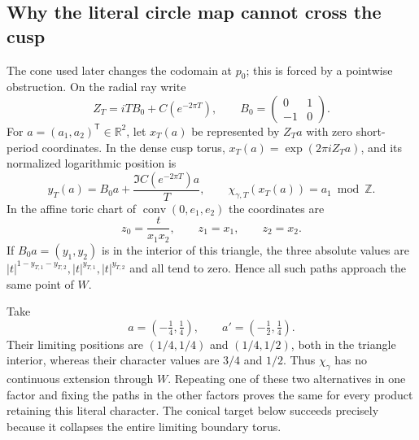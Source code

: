 \documentclass[11pt,letterpaper]{article}
\numberwithin{equation}{section}
\theoremstyle{definition}
\theoremstyle{remark}
\newcommand{\R}{\mathbb R}
\newcommand{\Z}{\mathbb Z}
\begin{document}
\subsection{Why the literal circle map cannot cross the cusp}

The cone used later changes the codomain at $p_0$; this is forced by a
pointwise obstruction.  On the radial ray write
\begin{equation}
 Z_T=iTB_0+C(e^{-2\pi T}),\qquad
 B_0=\begin{pmatrix}0&1\\-1&0\end{pmatrix}.
 \label{eq:toric-period}
\end{equation}
For $a=(a_1,a_2)^{\mathsf T}\in\R^2$, let $x_T(a)$ be represented by
$Z_Ta$ with zero short-period coordinates.  In the dense cusp torus,
$x_T(a)=\exp(2\pi iZ_Ta)$, and its normalized logarithmic position is
\begin{equation}
 y_T(a)=B_0a+\frac{\Im C(e^{-2\pi T})a}{T},
 \qquad
 \chi_{\gamma,T}(x_T(a))=a_1\bmod\Z.
 \label{eq:toric-paths}
\end{equation}
In the affine toric chart of
$\operatorname{conv}(0,e_1,e_2)$ the coordinates are
\begin{equation}
 z_0=\frac{t}{x_1x_2},\qquad z_1=x_1,\qquad z_2=x_2.
 \label{eq:toric-chart}
\end{equation}
If $B_0a=(y_1,y_2)$ is in the interior of this triangle, the three
absolute values are
$|t|^{1-y_{T,1}-y_{T,2}},|t|^{y_{T,1}},|t|^{y_{T,2}}$ and all tend to
zero.  Hence all such paths approach the same point of $W$.

Take
\begin{equation}
 a=(-\tfrac14,\tfrac14),\qquad
 a'=(-\tfrac12,\tfrac14).
 \label{eq:two-obstruction-paths}
\end{equation}
Their limiting positions are $(1/4,1/4)$ and $(1/4,1/2)$, both in the
triangle interior, whereas their character values are $3/4$ and $1/2$.
Thus $\chi_\gamma$ has no continuous extension through $W$.  Repeating
one of these two alternatives in one factor and fixing the paths in the
other factors proves the same for every product retaining this literal
character.  The conical target below succeeds precisely because it collapses
the entire limiting boundary torus.
\end{document}
